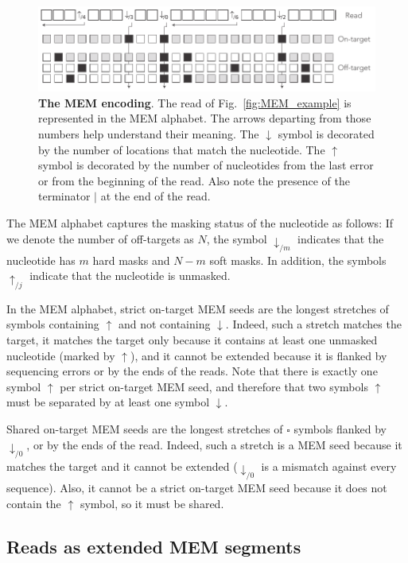 \documentclass{article}
\begin{document}
\begin{figure}[h]
\centering
\includegraphics[scale=.85]{sketch_extended.pdf}
\caption{\textbf{The MEM encoding}.
The read of Fig.~\ref{fig:MEM_example} is represented in the MEM alphabet.
The arrows departing from those numbers help understand their meaning. The
$\downarrow$ symbol is decorated by the number of locations that match the
nucleotide. The $\uparrow$ symbol is decorated by the number of
nucleotides from the last error or from the beginning of the read. Also
note the presence of the terminator $|$ at the end of the read.}
\label{fig:sketch_extended}
\end{figure}

The MEM alphabet captures the masking status of the nucleotide as follows:
If we denote the number of off-targets as $N$, the symbol
$\downarrow_{/m}$ indicates that the nucleotide has $m$ hard masks and
$N-m$ soft masks. In addition, the symbols $\uparrow_{/j}$ indicate that
the nucleotide is unmasked.

In the MEM alphabet, strict on-target MEM seeds are the longest stretches
of symbols containing $\uparrow$ and not containing $\downarrow$. Indeed,
such a stretch matches the target, it matches the target only because it
contains at least one unmasked nucleotide (marked by $\uparrow$), and it
cannot be extended because it is flanked by sequencing errors or by the
ends of the reads. Note that there is exactly one symbol $\uparrow$ per
strict on-target MEM seed, and therefore that two symbols $\uparrow$ must
be separated by at least one symbol $\downarrow$.

Shared on-target MEM seeds are the longest stretches of $\square$ symbols
flanked by $\downarrow_{/0}$, or by the ends of the read. Indeed, such a
stretch is a MEM seed because it matches the target and it cannot be
extended ($\downarrow_{/0}$ is a mismatch against every sequence). Also,
it cannot be a strict on-target MEM seed because it does not contain the
$\uparrow$ symbol, so it must be shared.

\subsection{Reads as extended MEM segments}
\end{document}
